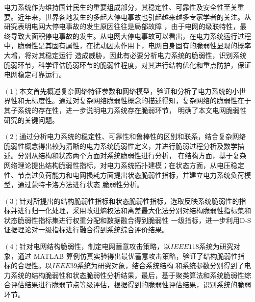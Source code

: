\begin{cabstract}
电力系统作为维持国计民生的重要组成部分，其稳定性、可靠性及安全性至关重要。近年来，世界各地发生的多起大停电事故也引起越来越多专家学者的关注。从研究表明电网大停电事故的发生原因往往是局部故障
，由于电网的级联特性，最终导致大面积停电事故的发生。从电网大停电事故可以看出，在电力系统运行过程中，脆弱性是其固有属性，在扰动因素作用下，电网自身固有的脆弱性显现的概率大增，将对其稳定运行
造成威胁，因此有必要分析电力系统的脆弱性，识别系统脆弱环节，科学评估脆弱环节的脆弱性程度，对其进行结构优化和重点防护，保证电网稳定可靠运行。

$(1)$本文首先概述复杂网络特征参数和网络模型，验证和分析了电力系统的小世界性和无标度性。通过对复杂网络脆弱性概念的描述得知，复杂网络的脆弱性在于其子系统的存在性，进一步说明电力系统存在脆弱环节，
明确了本文电网脆弱性研究的关键问题。

$(2)$通过分析电力系统的稳定性、可靠性和鲁棒性的区别和联系，结合复杂网络脆弱性概念得出较为清晰的电力系统脆弱性定义，并进行脆弱过程分析及数学描述。分别从结构和状态两个方面对系统脆弱性进行分析，
在结构方面，基于复杂网络理论提出结构脆弱性指标，对电力系统拓扑建模；在状态方面，从电压稳定性、节点过负荷能力和电网损耗方面提出状态脆弱性指标，并建立电力系统负荷模型，通过蒙特卡洛方法进行状态
脆弱性分析。

$(3)$针对所提出的结构脆弱性指标和状态脆弱性指标，选取反映系统脆弱性的指标并进行归一化处理，采用改进熵权法和离差最大化法分别对结构脆弱性指标集和状态脆弱性指标集进行权重分配和数据融合得到脆弱性
一级指标，进一步利用D-S证据理论对一级指标进行融合得到系统综合评价结果。

$(4)$针对电网结构脆弱性，制定电网蓄意攻击策略，以$IEEE118$系统为研究对象，通过 MATLAB 算例仿真实验得出最优蓄意攻击策略，验证了结构脆弱性指标的合理性。以$IEEE39$系统为研究对象，结合系统结构
和系统参数分别得到了电力系统的结构脆弱性和状态脆弱性分析结果，最后，基于聚类算法和系统脆弱性综合评估结果进行脆弱节点等级评估，根据得到的脆弱性评估结果，识别系统的脆弱环节。



\end{cabstract}


\begin{eabstract}

\end{eabstract}

\ekeywords{} 
